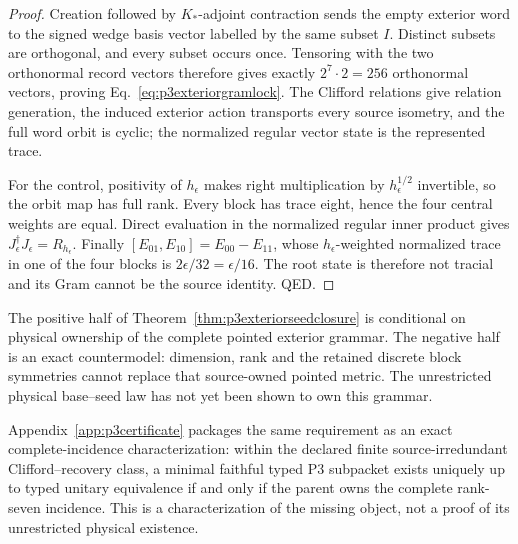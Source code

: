 \documentclass[11pt]{article}
\begin{document}
\begin{proof}
Creation followed by $K_*$-adjoint contraction sends the empty exterior word
to the signed wedge basis vector labelled by the same subset $I$.  Distinct
subsets are orthogonal, and every subset occurs once.  Tensoring with the two
orthonormal record vectors therefore gives exactly $2^7\cdot2=256$
orthonormal vectors, proving Eq.~\eqref{eq:p3exteriorgramlock}.  The Clifford
relations give relation generation, the induced exterior action transports
every source isometry, and the full word orbit is cyclic; the normalized
regular vector state is the represented trace.

For the control, positivity of $h_\epsilon$ makes right multiplication by
$h_\epsilon^{1/2}$ invertible, so the orbit map has full rank.  Every block
has trace eight, hence the four central weights are equal.  Direct evaluation
in the normalized regular inner product gives
$J_\epsilon^\dagger J_\epsilon=R_{h_\epsilon}$.  Finally
$[E_{01},E_{10}]=E_{00}-E_{11}$, whose $h_\epsilon$-weighted normalized trace
in one of the four blocks is $2\epsilon/32=\epsilon/16$.  The root state is
therefore not tracial and its Gram cannot be the source identity. QED.
\end{proof}

The positive half of Theorem~\ref{thm:p3exteriorseedclosure} is conditional
on physical ownership of the complete pointed exterior grammar.  The
negative half is an exact countermodel: dimension, rank and the retained
discrete block symmetries cannot replace that source-owned pointed metric.
The unrestricted physical base--seed law has not yet been shown to own this
grammar.


Appendix~\ref{app:p3certificate} packages the same requirement as an exact
complete-incidence characterization: within the declared finite
source-irredundant Clifford--recovery class, a minimal faithful typed P3
subpacket exists uniquely up to typed unitary equivalence if and only if the
parent owns the complete rank-seven incidence.  This is a characterization of
the missing object, not a proof of its unrestricted physical existence.
\end{document}

